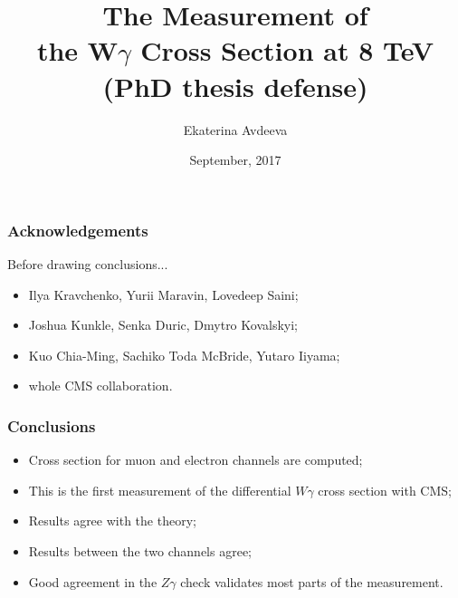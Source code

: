 \documentclass{beamer}
\title{The Measurement of \\ the W$\gamma$ Cross Section at 8 TeV \\ (PhD thesis defense) }
\author{Ekaterina Avdeeva}
\institute{University of Nebraska - Lincoln}
\date{September, 2017}
\begin{document}
\begin{frame}
\titlepage %
\end{frame}


\begin{frame}\frametitle{Acknowledgements} %
  \scriptsize
  Before drawing conclusions...
  \begin{itemize}
     \item Ilya Kravchenko, Yurii Maravin, Lovedeep Saini;
     \item Joshua Kunkle, Senka Duric, Dmytro Kovalskyi;
     \item Kuo Chia-Ming, Sachiko Toda McBride, Yutaro Iiyama;
     \item whole CMS collaboration.
  \end{itemize}
\end{frame}%
 

\begin{frame}\frametitle{Conclusions} %
  \scriptsize
  \begin{itemize}
     \item Cross section for muon and electron channels are computed; 
     \item This is the first measurement of the differential $W\gamma$ cross section with CMS;
     \item Results agree with the theory;
     \item Results between the two channels agree;
     \item Good agreement in the $Z\gamma$ check validates most parts of the measurement.
  \end{itemize}
\end{frame}%



%
\end{document}
